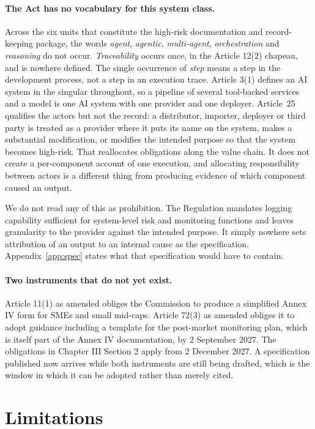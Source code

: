 \documentclass[11pt]{article}
\theoremstyle{remark}
\begin{document}
\paragraph{The Act has no vocabulary for this system class.} Across the six units
that constitute the high-risk documentation and record-keeping package, the words
\emph{agent}, \emph{agentic}, \emph{multi-agent}, \emph{orchestration} and
\emph{reasoning} do not occur. \emph{Traceability} occurs once, in the Article
12(2) chapeau, and is nowhere defined. The single occurrence of \emph{step} means
a step in the development process, not a step in an execution trace. Article 3(1)
defines an AI system in the singular throughout, so a pipeline of several
tool-backed services and a model is one AI system with one provider and one
deployer. Article~25 qualifies the actors but not the record: a distributor,
importer, deployer or third party is treated as a provider where it puts its
name on the system, makes a substantial modification, or modifies the intended
purpose so that the system becomes high-risk. That reallocates obligations along
the value chain. It does not create a per-component account of one execution,
and allocating responsibility between actors is a different thing from producing
evidence of which component caused an output.

We do not read any of this as prohibition. The Regulation mandates logging
capability sufficient for system-level risk and monitoring functions and leaves
granularity to the provider against the intended purpose. It simply nowhere sets
attribution of an output to an internal cause as the specification. Appendix~\ref{app:spec}
states what that specification would have to contain.

\paragraph{Two instruments that do not yet exist.} Article 11(1) as amended
obliges the Commission to produce a simplified Annex IV form for SMEs and small
mid-caps. Article 72(3) as amended obliges it to adopt guidance including a
template for the post-market monitoring plan, which is itself part of the Annex
IV documentation, by 2 September 2027. The obligations in Chapter III Section 2
apply from 2 December 2027. A specification published now arrives while both
instruments are still being drafted, which is the window in which it can be
adopted rather than merely cited.

\section{Limitations}
\label{sec:limitations}
\end{document}
